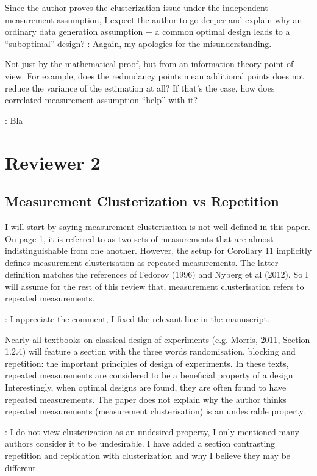 \documentclass{amsart}
\begin{document}
Since the author proves the clusterization issue under the independent
measurement assumption, I expect the author to go deeper and explain
why an ordinary data generation assumption + a common optimal design
leads to a “suboptimal” design?
\answer: Aagain, my apologies for the misunderstanding.

Not just by the mathematical proof, but from an information theory
point of view. For example, does the redundancy points mean additional
points does not reduce the variance of the estimation at all? If
that’s the case, how does correlated measurement assumption “help”
with it?

\answer: Bla

\section{Reviewer 2}
\subsection{Measurement Clusterization vs Repetition}
I will start by saying measurement clusterisation is not well-defined
in this paper. On page 1, it is referred to as two sets of
measurements that are almost indistinguishable from one
another. However, the setup for Corollary 11 implicitly defines
measurement clusterisation as repeated measurements. The latter
definition matches the references of Fedorov (1996) and Nyberg et al
(2012). So I will assume for the rest of this review that, measurement
clusterisation refers to repeated measurements.

\answer: I appreciate the comment, I fixed the relevant line in the
manuscript.

Nearly all textbooks on classical design of experiments (e.g. Morris,
2011, Section 1.2.4) will feature a section with the three words
randomisation, blocking and repetition: the important principles of
design of experiments.  In these texts, repeated measurements are
considered to be a beneficial property of a design. Interestingly,
when optimal designs are found, they are often found to have repeated
measurements. The paper does not explain why the author thinks
repeated measurements (measurement clusterisation) is an undesirable
property.

\answer: I do not view clusterization as an undesired property, I only
mentioned many authors consider it to be undesirable. I have added a
section contrasting repetition and replication with clusterization and
why I believe they may be different.
\end{document}
